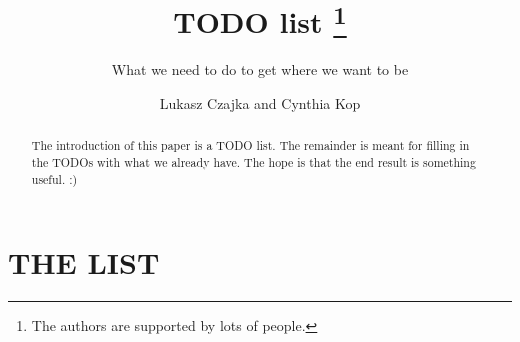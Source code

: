 \documentclass[runningheads,a4paper]{llncs}
\begin{document}
\mainmatter

\title{TODO list
  \thanks{The authors are supported by lots of people.}}
\subtitle{What we need to do to get where we want to be}

\author{Lukasz Czajka and Cynthia Kop}

\maketitle

\begin{abstract}
The introduction of this paper is a TODO list.
The remainder is meant for filling in the TODOs with what we already
have.
The hope is that the end result is something useful. :)
\end{abstract}

\section*{THE LIST}
\end{document}
